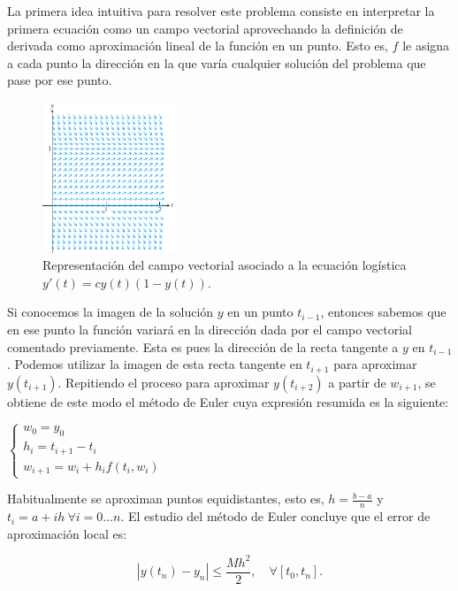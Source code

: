\documentclass{article}
\theoremstyle{theorem-style}  %
\theoremstyle{definition}
\theoremstyle{example-style}
\begin{document}
	La primera idea intuitiva para resolver este problema consiste en interpretar la primera ecuación como un campo vectorial aprovechando la definición de derivada como aproximación lineal de la función en un punto. Esto es, $f$ le asigna a cada punto la dirección en la que varía cualquier solución del problema que pase por ese punto.

	\begin{figure}[h]
		\centering
		\includegraphics[width=4cm]{./Images/interpret-pvi.png}
		\caption{Representación del campo vectorial asociado a la ecuación logística $y'(t) = c y(t) (1 - y(t))$.} 
		\label{fig:interpret-pvi}
	\end{figure}

	Si conocemos la imagen de la solución $y$ en un punto $t_{i-1}$, entonces sabemos que en ese punto la función variará en la dirección dada por el campo vectorial comentado previamente. Esta es pues la dirección de la recta tangente a $y$ en $t_{i-1}$. Podemos utilizar la imagen de esta recta tangente en $t_{i+1}$ para aproximar $y(t_{i+1})$. Repitiendo el proceso para aproximar $y(t_{i+2})$ a partir de $w_{i+1}$, se obtiene de este modo el método de Euler cuya expresión resumida es la siguiente:

	\begin{center}
		$\begin{cases}
		w_0=y_0 \\
		h_{i} = t_{i+1} - t_i \\
		w_{i+1} = w_i + h_{i} f(t_i,w_i)
		\end{cases}$
	\end{center}
	
	Habitualmente se aproximan puntos equidistantes, esto es, $h = \frac{b-a}{n}$ y $t_i = a + ih \ \forall i = 0 \ldots n$. El estudio del método de Euler concluye que el error de aproximación local es:
	
	\begin{equation}
	\label{0.0}
	|y(t_n)-y_n| \le \frac{Mh^2}{2}, \quad   \forall [t_0,t_n].
	\end{equation}	
	
\end{document}

